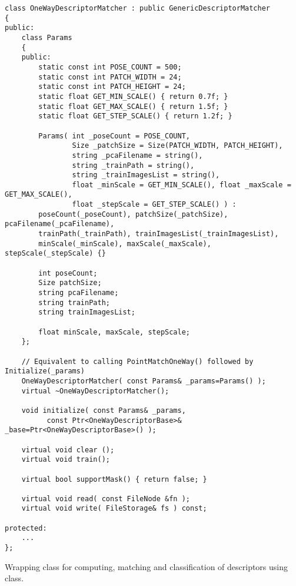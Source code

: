\begin{lstlisting}
class OneWayDescriptorMatcher : public GenericDescriptorMatcher
{
public:
    class Params
    {
    public:
        static const int POSE_COUNT = 500;
        static const int PATCH_WIDTH = 24;
        static const int PATCH_HEIGHT = 24;
        static float GET_MIN_SCALE() { return 0.7f; }
        static float GET_MAX_SCALE() { return 1.5f; }
        static float GET_STEP_SCALE() { return 1.2f; }

        Params( int _poseCount = POSE_COUNT,
                Size _patchSize = Size(PATCH_WIDTH, PATCH_HEIGHT),
                string _pcaFilename = string(),
                string _trainPath = string(),
                string _trainImagesList = string(),
                float _minScale = GET_MIN_SCALE(), float _maxScale = GET_MAX_SCALE(),
                float _stepScale = GET_STEP_SCALE() ) :
        poseCount(_poseCount), patchSize(_patchSize), pcaFilename(_pcaFilename),
        trainPath(_trainPath), trainImagesList(_trainImagesList),
        minScale(_minScale), maxScale(_maxScale), stepScale(_stepScale) {}

        int poseCount;
        Size patchSize;
        string pcaFilename;
        string trainPath;
        string trainImagesList;

        float minScale, maxScale, stepScale;
    };

    // Equivalent to calling PointMatchOneWay() followed by Initialize(_params)
    OneWayDescriptorMatcher( const Params& _params=Params() );
    virtual ~OneWayDescriptorMatcher();

    void initialize( const Params& _params, 
          const Ptr<OneWayDescriptorBase>& _base=Ptr<OneWayDescriptorBase>() );

    virtual void clear ();
	virtual void train();

    virtual bool supportMask() { return false; }

    virtual void read( const FileNode &fn );
    virtual void write( FileStorage& fs ) const;

protected:
    ...
};
\end{lstlisting}

Wrapping class for computing, matching and classification of descriptors using  class.

